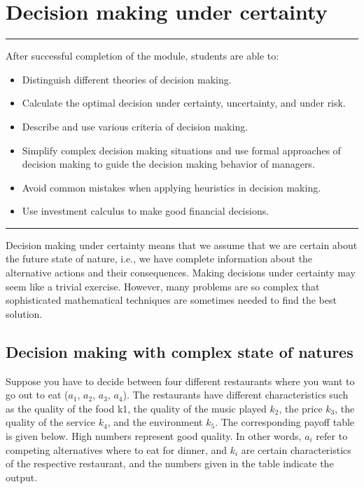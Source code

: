 \documentclass[
  12pt,
  oneside]{book}
\providecommand{\tightlist}{%
  \setlength{\itemsep}{0pt}\setlength{\parskip}{0pt}}
\theoremstyle{definition}
\theoremstyle{definition}
\theoremstyle{definition}
\theoremstyle{definition}
\theoremstyle{remark}
\begin{document}
\hypertarget{decision-making-under-certainty}{%
\section{Decision making under certainty}\label{decision-making-under-certainty}}

\begin{center}\rule{0.5\linewidth}{0.5pt}\end{center}

After successful completion of the module, students are able to:

\begin{itemize}
\tightlist
\item
  Distinguish different theories of decision making.
\item
  Calculate the optimal decision under certainty, uncertainty, and under risk.
\item
  Describe and use various criteria of decision making.
\item
  Simplify complex decision making situations and use formal approaches of decision making to guide the decision making behavior of managers.
\item
  Avoid common mistakes when applying heuristics in decision making.
\item
  Use investment calculus to make good financial decisions.
\end{itemize}

\begin{center}\rule{0.5\linewidth}{0.5pt}\end{center}

Decision making under certainty means that we assume that we are certain about the future state of nature, i.e., we have complete information about the alternative actions and their consequences. Making decisions under certainty may seem like a trivial exercise. However, many problems are so complex that sophisticated mathematical techniques are sometimes needed to find the best solution.

\hypertarget{decision-making-with-complex-state-of-natures}{%
\subsection{Decision making with complex state of natures}\label{decision-making-with-complex-state-of-natures}}

Suppose you have to decide between four different restaurants where you want to go out to eat (\(a_1\), \(a_2\), \(a_3\), \(a_4\)). The restaurants have different characteristics such as the quality of the food k1, the quality of the music played \(k_2\), the price \(k_3\), the quality of the service \(k_4\), and the environment \(k_5\). The corresponding payoff table is given below. High numbers represent good quality. In other words, \(a_i\) refer to competing alternatives where to eat for dinner, and \(k_i\) are certain characteristics of the respective restaurant, and the numbers given in the table indicate the output.
\end{document}
